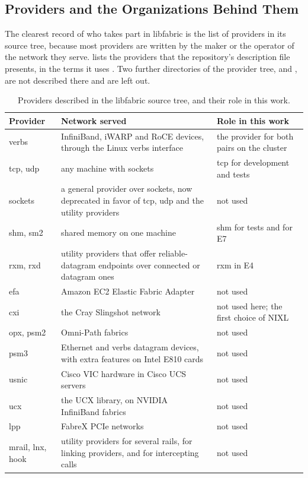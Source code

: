 \subsection{Providers and the Organizations Behind Them}
\label{sec:ofi-providers}

The clearest record of who takes part in libfabric is the list of providers
in its source tree, because most providers are written by the maker or the
operator of the network they serve.  lists the providers
that the repository's description file presents, in the terms it uses
\citep{libfabric_repo}. Two further directories of the provider tree,
 and , are not described there and are left out.

\begin{table}[htbp]
  \centering
  \caption[Providers in the libfabric source tree]{Providers described in the libfabric source tree, and their role in this work.}
  \label{tab:providers}
  \small
  \begin{tabular}{L{2.9cm}L{6.6cm}L{4.7cm}}
    \toprule
    Provider & Network served & Role in this work \\
    \midrule
    verbs & InfiniBand, iWARP and RoCE devices, through the Linux verbs interface & the provider for both pairs on the cluster \\
    tcp, udp & any machine with sockets & tcp for development and tests \\
    sockets & a general provider over sockets, now deprecated in favor of tcp, udp and the utility providers & not used \\
    shm, sm2 & shared memory on one machine & shm for tests and for E7 \\
    rxm, rxd & utility providers that offer reliable-datagram endpoints over connected or datagram ones & rxm in E4 \\
    efa & Amazon EC2 Elastic Fabric Adapter & not used \\
    cxi & the Cray Slingshot network & not used here; the first choice of NIXL \\
    opx, psm2 & Omni-Path fabrics & not used \\
    psm3 & Ethernet and verbs datagram devices, with extra features on Intel E810 cards & not used \\
    usnic & Cisco VIC hardware in Cisco UCS servers & not used \\
    ucx & the UCX library, on NVIDIA InfiniBand fabrics & not used \\
    lpp & FabreX PCIe networks & not used \\
    mrail, lnx, hook & utility providers for several rails, for linking providers, and for intercepting calls & not used \\
    \bottomrule
  \end{tabular}
\end{table}


